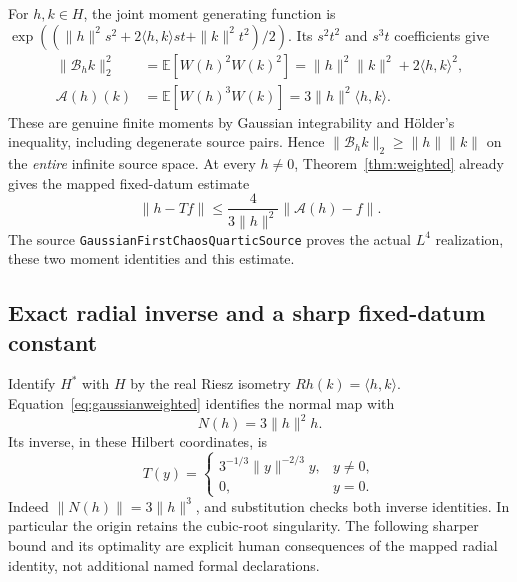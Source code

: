\documentclass[11pt]{article}
\theoremstyle{remark}\newtheorem{remark}[theorem]{Remark}
\newcommand{\A}{\mathcal A}
\newcommand{\B}{\mathcal B}
\newcommand{\code}[1]{{\small\nolinkurl{#1}}}
\begin{document}
For $h,k\in H$, the joint moment generating function is
$\exp((\|h\|^2s^2+2\langle h,k\rangle st+\|k\|^2t^2)/2)$.
Its $s^2t^2$ and $s^3t$ coefficients give
\begin{align}\label{eq:gaussianweighted}
 \|\B_hk\|_2^2
 &=\mathbb E[W(h)^2W(k)^2]
   =\|h\|^2\|k\|^2+2\langle h,k\rangle^2,\\
 \A(h)(k)&=\mathbb E[W(h)^3W(k)]
   =3\|h\|^2\langle h,k\rangle.\nonumber
\end{align}
These are genuine finite moments by Gaussian integrability and
H\"older's inequality, including degenerate source pairs.
Hence $\|\B_hk\|_2\geq\|h\|\|k\|$ on the \emph{entire}
infinite source space. At every $h\ne0$, Theorem~\ref{thm:weighted}
already gives the mapped fixed-datum estimate
\begin{equation}\label{eq:gaussianmapped}
 \|h-Tf\|\leq\frac4{3\|h\|^2}\|\A(h)-f\|.
\end{equation}
The source \code{GaussianFirstChaosQuarticSource} proves the actual
$L^4$ realization, these two moment identities and this estimate.

\subsection{Exact radial inverse and a sharp fixed-datum constant}
Identify $H^*$ with $H$ by the real Riesz isometry
$Rh(k)=\langle h,k\rangle$. Equation~\eqref{eq:gaussianweighted}
identifies the normal map with
\[
 N(h)=3\|h\|^2h.
\]
Its inverse, in these Hilbert coordinates, is
\begin{equation}\label{eq:gaussianinverse}
 T(y)=\begin{cases}
 3^{-1/3}\|y\|^{-2/3}y,&y\ne0,\\0,&y=0.
 \end{cases}
\end{equation}
Indeed $\|N(h)\|=3\|h\|^3$, and substitution checks both inverse
identities. In particular the origin retains the cubic-root singularity.
The following sharper bound and its optimality are explicit human
consequences of the mapped radial identity, not additional named
formal declarations.
\end{document}
